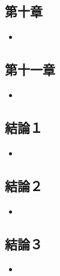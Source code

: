 \subsection{第十章}\label{ux7b2cux5341ux7ae0}

\begin{itemize}
\tightlist
\item
\end{itemize}

\subsection{第十一章}\label{ux7b2cux5341ux4e00ux7ae0}

\begin{itemize}
\tightlist
\item
\end{itemize}

\subsection{結論１}\label{ux7d50ux8ad6uxff11}

\begin{itemize}
\tightlist
\item
\end{itemize}

\subsection{結論２}\label{ux7d50ux8ad6uxff12}

\begin{itemize}
\tightlist
\item
\end{itemize}

\subsection{結論３}\label{ux7d50ux8ad6uxff13}

\begin{itemize}
\tightlist
\item
\end{itemize}
